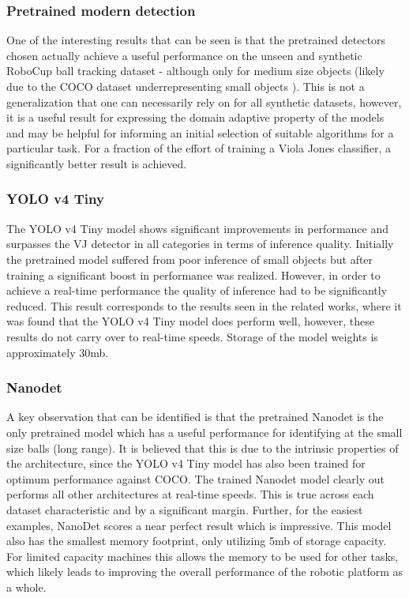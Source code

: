 \documentclass[a4paper,twoside,12pt]{report}
\begin{document}
\subsubsection{Pretrained modern detection}

One of the interesting results that can be seen is that the pretrained detectors chosen actually achieve a useful performance on the unseen and synthetic RoboCup ball tracking dataset - although only for medium size objects (likely due to the COCO dataset underrepresenting small objects \citep{smallcoco}). This is not a generalization that one can necessarily rely on for all synthetic datasets, however, it is a useful result for expressing the domain adaptive property of the models and may be helpful for informing an initial selection of suitable algorithms for a particular task. For a fraction of the effort of training a Viola Jones classifier, a significantly better result is achieved.

\subsubsection{YOLO v4 Tiny}

The YOLO v4 Tiny model shows significant improvements in performance and surpasses the VJ detector in all categories in terms of inference quality. Initially the pretrained model suffered from poor inference of small objects but after training a significant boost in performance was realized. However, in order to achieve a real-time performance the quality of inference had to be significantly reduced. This result corresponds to the results seen in the related works, where it was found that the YOLO v4 Tiny model does perform well, however, these results do not carry over to real-time speeds. Storage of the model weights is approximately 30mb.

\subsubsection{Nanodet}

A key observation that can be identified is that the pretrained Nanodet is the only pretrained model which has a useful performance for identifying at the small size balls (long range). It is believed that this is due to the intrinsic properties of the architecture, since the YOLO v4 Tiny model has also been trained for optimum performance against COCO. The trained Nanodet model clearly out performs all other architectures at real-time speeds. This is true across each dataset characteristic and by a significant margin. Further, for the easiest examples, NanoDet scores a near perfect result which is impressive. This model also has the smallest memory footprint, only utilizing 5mb of storage capacity. For limited capacity machines this allows the memory to be used for other tasks, which likely leads to improving the overall performance of the robotic platform as a whole. 
\end{document}
